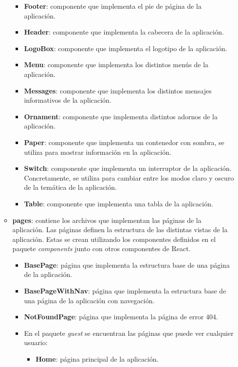 \begin{itemize}
\begin{itemize}
\begin{itemize}
            \item \textbf{Footer}: componente que implementa el pie de página de la aplicación.
            \item \textbf{Header}: componente que implementa la cabecera de la aplicación.
            \item \textbf{LogoBox}: componente que implementa el logotipo de la aplicación.
            \item \textbf{Menu}: componente que implementa los distintos menús de la aplicación.
            \item \textbf{Messages}: componente que implementa los distintos mensajes informativos de la aplicación.
            \item \textbf{Ornament}: componente que implementa distintos adornos de la aplicación.
            \item \textbf{Paper}: componente que implementa un contenedor con sombra, se utiliza para mostrar información en la aplicación.
            \item \textbf{Switch}: componente que implementa un interruptor de la aplicación. Concretamente, se utiliza para cambiar entre los modos claro y oscuro de la temática de la aplicación.
            \item \textbf{Table}: componente que implementa una tabla de la aplicación.
        \end{itemize}
        \item \textbf{pages}: contiene los archivos que implementan las páginas de la aplicación. Las páginas definen la estructura de las distintas vistas de la aplicación.
        Estas se crean utilizando los componentes definidos en el paquete \textit{components} junto con otros componentes de React.
        \begin{itemize}
            \item \textbf{BasePage}: página que implementa la estructura base de una página de la aplicación.
            \item \textbf{BasePageWithNav}: página que implementa la estructura base de una página de la aplicación con navegación.
            \item \textbf{NotFoundPage}: página que implementa la página de error 404.
            \item En el paquete \textit{guest} se encuentran las páginas que puede ver cualquier usuario:
            \begin{itemize}
                \item \textbf{Home}: página principal de la aplicación.

\end{itemize}
\end{itemize}
\end{itemize}
\end{itemize}
